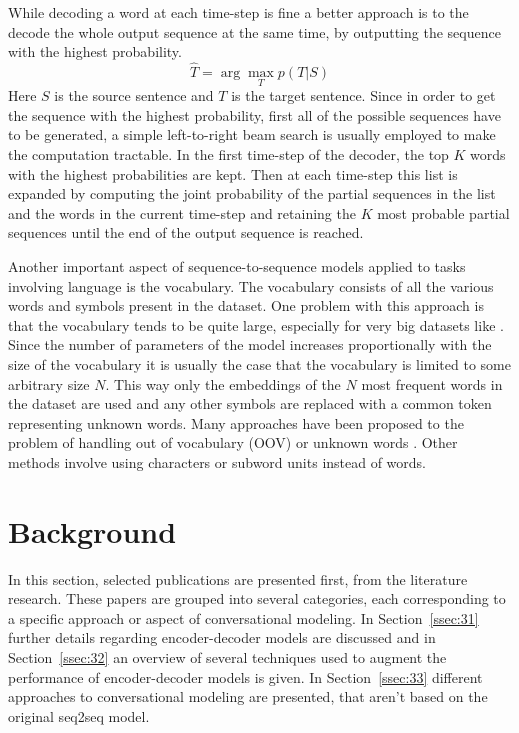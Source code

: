 \documentclass[12pt]{article}
\begin{document}
While decoding a word at each time-step is fine a better approach is to the decode the whole output sequence at the same time, by outputting the sequence with the highest probability.
\begin{equation} \label{eq233}
\hat{T}=\arg\max_{T}p(T|S)
\end{equation}
Here \(S\) is the source sentence and \(T\) is the target sentence. Since in order to get the sequence with the highest probability, first all of the possible sequences have to be generated, a simple left-to-right beam search is usually employed to make the computation tractable. In the first time-step of the decoder, the top \(K\) words with the highest probabilities are kept. Then at each time-step this list is expanded by computing the joint probability of the partial sequences in the list and the words in the current time-step and retaining the \(K\) most probable partial sequences until the end of the output sequence is reached.

Another important aspect of sequence-to-sequence models applied to tasks involving language is the vocabulary. The vocabulary consists of all the various words and symbols present in the dataset. One problem with this approach is that the vocabulary tends to be quite large, especially for very big datasets like \cite{OpenSubtitles:2016,opensubtitles}. Since the number of parameters of the model increases proportionally with the size of the vocabulary it is usually the case that the vocabulary is limited to some arbitrary size \(N\). This way only the embeddings of the \(N\) most frequent words in the dataset are used and any other symbols are replaced with a common token representing unknown words. Many approaches have been proposed to the problem of handling out of vocabulary (OOV) or unknown words \cite{Luong:2014,Feng:2017,Jean:2014}. Other methods involve using characters \cite{Zhu:2017} or subword units \cite{Sennrich:2015} instead of words.

\newpage\section{Background} \label{sec:background}
In this section, selected publications are presented first, from the literature research. These papers are grouped into several categories, each corresponding to a specific approach or aspect of conversational modeling. In Section~\ref{ssec:31} further details regarding encoder-decoder models are discussed and in Section~\ref{ssec:32} an overview of several techniques used to augment the performance of encoder-decoder models is given. In Section~\ref{ssec:33} different approaches to conversational modeling are presented, that aren't based on the original seq2seq model.
\end{document}
